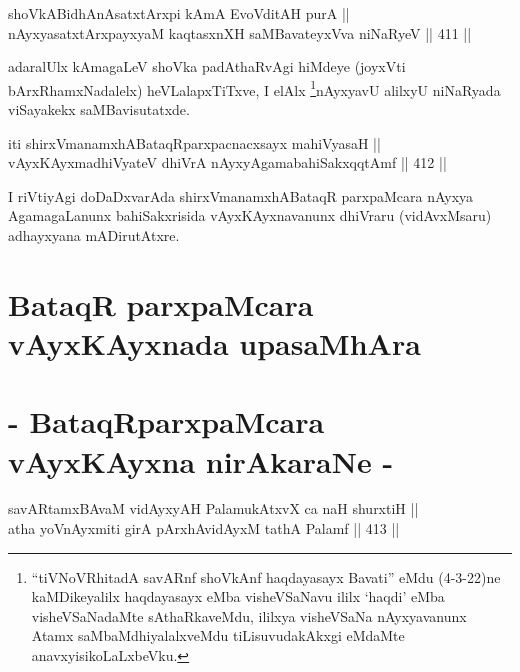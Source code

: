 \begin{shl}
shoVkABidhAnAsatxtArxpi kAmA EvoVditAH purA || \\
nAyxyasatxtArxpayxyaM kaqtasxnXH saMBavateyxVva niNaRyeV \hfill || 411 ||  
\end{shl}

\begin{artha}
adaralUlx kAmagaLeV shoVka padAthaRvAgi hiMdeye (joyxVti
bArxRhamxNadalelx) heVLalapxTiTxve, I elAlx \footnote{``tiVNoVRhitadA savARnf shoVkAnf haqdayasayx Bavati'' eMdu
(4-3-22)ne kaMDikeyalilx haqdayasayx eMba visheVSaNavu ililx `haqdi'
eMba visheVSaNadaMte sAthaRkaveMdu, ililxya visheVSaNa nAyxyavanunx
Atamx saMbaMdhiyalalxveMdu tiLisuvudakAkxgi eMdaMte
anavxyisikoLaLxbeVku.}nAyxyavU alilxyU niNaRyada viSayakekx saMBavisutatxde.
\end{artha}

\begin{shl}
iti shirxVmanamxhABataqRparxpacnacxsayx mahiVyasaH || \\
vAyxKAyxmadhiVyateV dhiVrA nAyxyAgamabahiSakxqqtAmf \hfill || 412 ||  
\end{shl}	

\begin{artha}
I riVtiyAgi doDaDxvarAda shirxVmanamxhABataqR parxpaMcara nAyxya
AgamagaLanunx bahiSakxrisida vAyxKAyxnavanunx dhiVraru (vidAvxMsaru)
adhayxyana mADirutAtxre.
\end{artha}

\section*{BataqR parxpaMcara vAyxKAyxnada upasaMhAra}

\section*{- BataqRparxpaMcara vAyxKAyxna nirAkaraNe -}

\begin{shl}
\footnotemark[2]savARtamxBAvaM vidAyxyAH PalamukAtxvX ca naH shurxtiH || \\
atha yoV\s nAyxmiti girA pArxhAvidAyxM tathA Palamf \hfill || 413 ||  
\end{shl}


